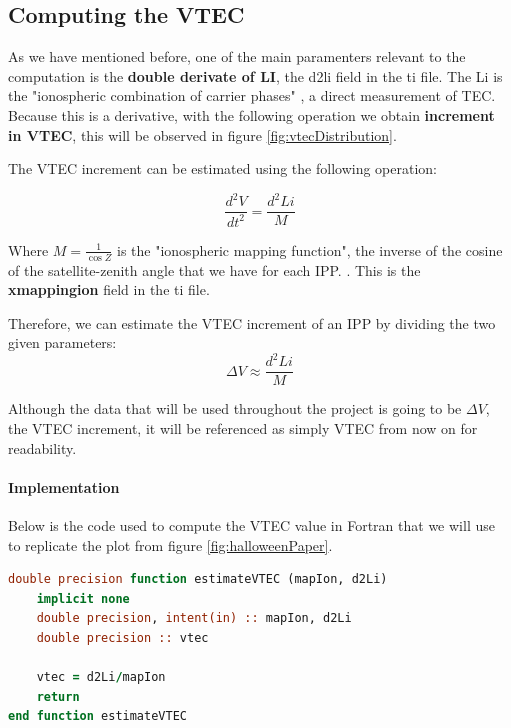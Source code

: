 \subsection{Computing the VTEC}

As we have mentioned before, one of the main paramenters relevant to the computation is the \textbf{double derivate of LI}, the d2li field in the ti file. The Li is the "ionospheric combination of carrier phases" \cite{hernandez2012gnss}, a direct measurement of TEC. Because this is a derivative, with the following operation we obtain \textbf{increment in VTEC}, this will be observed in figure \ref{fig:vtecDistribution}.

The VTEC increment can be estimated using the following operation:

\begin{equation} \label{eq:1}
	\frac{d^{2}V}{dt^{2}} = \frac{d^{2}Li}{M}
\end{equation}

Where $M=\frac{1}{\cos Z}$ is the "ionospheric mapping function", the inverse of the cosine of the satellite-zenith angle that we have for each IPP. \cite{hernandez2012gnss}. This is the \textbf{xmappingion} field in the ti file.

Therefore, we can estimate the VTEC increment of an IPP by dividing the two given parameters:
\begin{equation} \label{eq:2}
	\Delta V \approx \frac{d^{2}Li}{M}
\end{equation}

Although the data that will be used throughout the project is going to be $\Delta V$, the VTEC increment, it will be referenced as simply VTEC from now on for readability.

\paragraph{Implementation}

Below is the code used to compute the VTEC value in Fortran that we will use to replicate the plot from figure \ref{fig:halloweenPaper}.

\begin{minipage}{\linewidth}
\begin{lstlisting}[language=Fortran, caption=Simple Fortran function to compute the VTEC value]
double precision function estimateVTEC (mapIon, d2Li)
	implicit none
	double precision, intent(in) :: mapIon, d2Li
	double precision :: vtec
	
	vtec = d2Li/mapIon
	return
end function estimateVTEC
\end{lstlisting}
\end{minipage}


